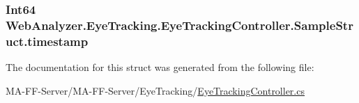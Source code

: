 \subsubsection[{timestamp}]{\setlength{\rightskip}{0pt plus 5cm}Int64 Web\+Analyzer.\+Eye\+Tracking.\+Eye\+Tracking\+Controller.\+Sample\+Struct.\+timestamp}\label{struct_web_analyzer_1_1_eye_tracking_1_1_eye_tracking_controller_1_1_sample_struct_aaaee2bfebc20de6cd2ec0b47d0e77e70}


The documentation for this struct was generated from the following file\+:\begin{DoxyCompactItemize}
\item 
M\+A-\/\+F\+F-\/\+Server/\+M\+A-\/\+F\+F-\/\+Server/\+Eye\+Tracking/\hyperlink{_eye_tracking_controller_8cs}{Eye\+Tracking\+Controller.\+cs}\end{DoxyCompactItemize}
